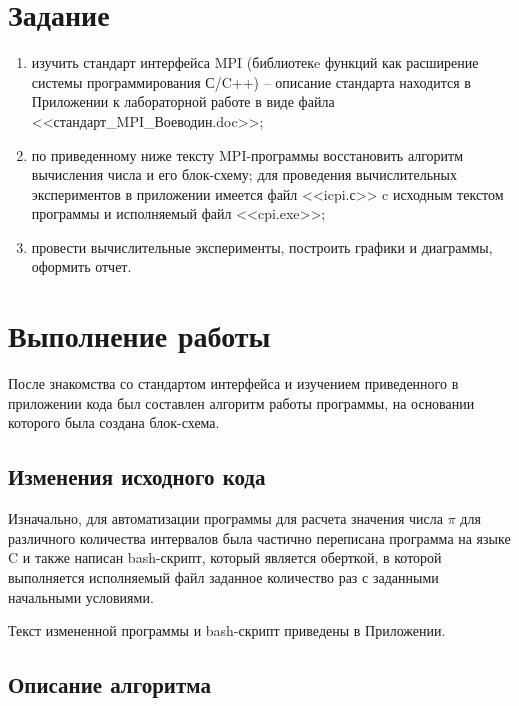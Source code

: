\documentclass{altsu-bachelor}
\begin{document}
\section*{Задание}

\begin{enumerate}
    \item изучить стандарт интерфейса MPI (библиотекe функций как расширение системы программирования С/C++) – описание стандарта находится в Приложении к лабораторной работе в виде файла <<стандарт\_MPI\_Воеводин.doc>>;

    \item по приведенному ниже тексту MPI-программы восстановить алгоритм вычисления числа  и его блок-схему; для проведения вычислительных экспериментов в приложении имеется файл <<icpi.с>> c исходным текстом программы и исполняемый файл <<cpi.exe>>;

    \item провести вычислительные эксперименты, построить графики и диаграммы, оформить отчет.
\end{enumerate}

\section*{Выполнение работы}

После знакомства со стандартом интерфейса и изучением приведенного в приложении кода был составлен алгоритм работы программы, на основании которого была создана блок-схема.

\subsection*{Изменения исходного кода}

Изначально, для автоматизации программы для расчета значения числа $\pi$ для различного количества интервалов была частично переписана программа на языке C и также написан bash-скрипт, который является оберткой, в которой выполняется исполняемый файл заданное количество раз с заданными начальными условиями.

Текст измененной программы и bash-скрипт приведены в Приложении.

\subsection*{Описание алгоритма}
\end{document}
